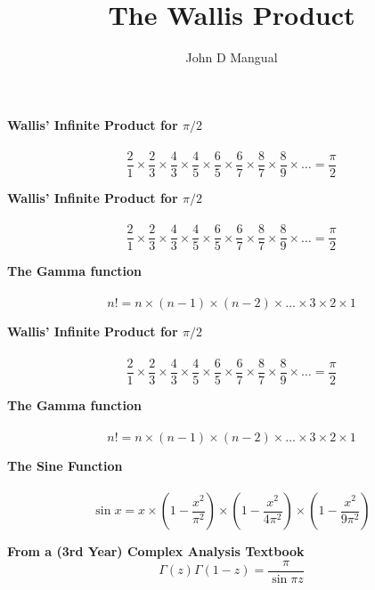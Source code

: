 \documentclass[12pt]{article}
\title{\textbf{ The Wallis Product }}
\author{John D Mangual}
\date{}
\begin{document}
\selectfont \fontsize{30}{30}\selectfont


\noindent \textbf{Wallis' Infinite Product for $\pi/2$} \\ \\
$$ \frac{2}{1}\times \frac{2}{3}\times
\frac{4}{3}\times \frac{4}{5}\times
\frac{6}{5}\times \frac{6}{7}\times
\frac{8}{7}\times \frac{8}{9}\times
\dots = \frac{\pi}{2} $$
\vspace{35pt}

\newpage


\noindent \textbf{Wallis' Infinite Product for $\pi/2$} \\ \\
$$ \frac{2}{1}\times \frac{2}{3}\times
\frac{4}{3}\times \frac{4}{5}\times
\frac{6}{5}\times \frac{6}{7}\times
\frac{8}{7}\times \frac{8}{9}\times
\dots = \frac{\pi}{2} $$
\vspace{35pt}

\noindent \textbf{The Gamma function} \\ \\
$$ n! = n \times (n-1) \times (n-2) \times \dots \times 3 \times 2 \times 1$$

\newpage


\noindent \textbf{Wallis' Infinite Product for $\pi/2$} \\ \\
$$ \frac{2}{1}\times \frac{2}{3}\times
\frac{4}{3}\times \frac{4}{5}\times
\frac{6}{5}\times \frac{6}{7}\times
\frac{8}{7}\times \frac{8}{9}\times
\dots = \frac{\pi}{2} $$
\vspace{35pt}

\noindent \textbf{The Gamma function} \\ \\
$$ n! = n \times (n-1) \times (n-2) \times \dots \times 3 \times 2 \times 1$$
\vspace{35pt}

\noindent \textbf{The Sine Function} \\ \\
$$ \sin x = x \times \left( 1 - \frac{x^2}{\pi^2} \right)  \times \left( 1 - \frac{x^2}{4\pi^2} \right)\times \left( 1 - \frac{x^2}{9\pi^2} \right)$$

\newpage

\noindent \textbf{From a (3rd Year) Complex Analysis Textbook}
$$ \Gamma(z) \Gamma(1-z) = \frac{\pi}{\sin \pi z}$$
\end{document}
